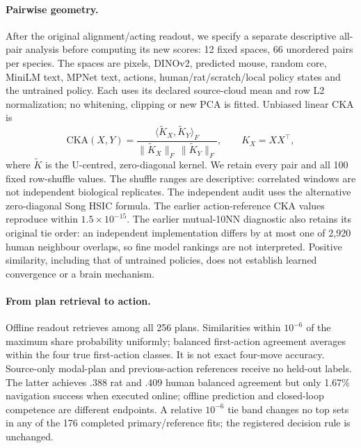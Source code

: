 \documentclass[10pt,onecolumn,letterpaper]{article}
\begin{document}
\paragraph{Pairwise geometry.}
After the original alignment/acting readout, we specify a separate descriptive all-pair analysis before computing
its new scores: 12 fixed spaces, 66 unordered pairs per species. The spaces are pixels, DINOv2, predicted mouse,
random core, MiniLM text, MPNet text, actions, human/rat/scratch/local policy states and the untrained policy.
Each uses its declared source-cloud mean and row L2 normalization; no whitening, clipping or new PCA is fitted.
Unbiased linear CKA is
\begin{equation}
\mathrm{CKA}(X,Y)=\frac{\langle\widetilde K_X,\widetilde K_Y\rangle_F}
{\|\widetilde K_X\|_F\,\|\widetilde K_Y\|_F},\qquad K_X=XX^\top,
\end{equation}
where $\widetilde K$ is the U-centred, zero-diagonal kernel. We retain every pair and all 100 fixed row-shuffle
values. The shuffle ranges are descriptive: correlated windows are not independent biological replicates.
The independent audit uses the alternative zero-diagonal Song HSIC formula. The earlier action-reference CKA
values reproduce within $1.5\times10^{-15}$. The earlier mutual-10NN diagnostic also retains its original tie
order: an independent implementation differs by at most one of 2,920 human neighbour overlaps, so fine model
rankings are not interpreted. Positive similarity, including that of untrained policies, does not establish
learned convergence or a brain mechanism.

\paragraph{From plan retrieval to action.}
Offline readout retrieves among all 256 plans. Similarities within $10^{-6}$ of the maximum share probability
uniformly; balanced first-action agreement averages within the four true first-action classes. It is not exact
four-move accuracy. Source-only modal-plan and previous-action references receive no held-out labels. The latter
achieves .388 rat and .409 human balanced agreement but only 1.67\% navigation success when executed online;
offline prediction and closed-loop competence are different endpoints. A relative $10^{-6}$ tie band changes
no top sets in any of the 176 completed primary/reference fits; the registered decision rule is unchanged.
\end{document}
